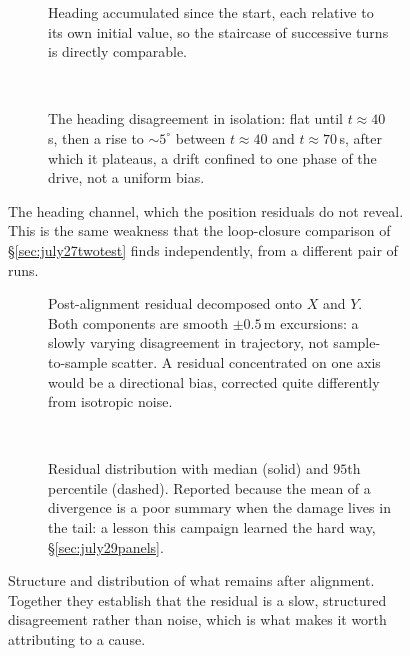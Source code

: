 \begin{figure}[p]
\centering
\begin{subfigure}{\linewidth}\centering
  \caption{Heading accumulated since the start, each relative to its own
  initial value, so the staircase of successive turns is directly comparable.}
  \label{fig:trajp5}
\end{subfigure}\\[8pt]
\begin{subfigure}{\linewidth}\centering
  \caption{The heading disagreement in isolation: flat until
  $t\approx40$\,s, then a rise to $\sim5^\circ$ between $t\approx40$ and
  $t\approx70$\,s, after which it plateaus, a drift confined to one phase
  of the drive, not a uniform bias.}
  \label{fig:trajp6}
\end{subfigure}
\caption{The heading channel, which the position residuals do not reveal.
This is the same weakness that the loop-closure comparison of
\S\ref{sec:july27twotest} finds independently, from a different pair of runs.}
\label{fig:trajyaw}
\end{figure}

\begin{figure}[p]
\centering
\begin{subfigure}{\linewidth}\centering
  \caption{Post-alignment residual decomposed onto $X$ and $Y$. Both
  components are smooth $\pm0.5$\,m excursions: a slowly varying
  disagreement in trajectory, not sample-to-sample scatter. A residual
  concentrated on one axis would be a directional bias, corrected quite
  differently from isotropic noise.}
  \label{fig:trajp7}
\end{subfigure}\\[8pt]
\begin{subfigure}{\linewidth}\centering
  \caption{Residual distribution with median (solid) and $95$th percentile
  (dashed). Reported because the mean of a divergence is a poor summary when
  the damage lives in the tail: a lesson this campaign learned the hard
  way, \S\ref{sec:july29panels}.}
  \label{fig:trajp8}
\end{subfigure}
\caption{Structure and distribution of what remains after alignment. Together
they establish that the residual is a slow, structured disagreement rather
than noise, which is what makes it worth attributing to a cause.}
\label{fig:trajresid}
\end{figure}

